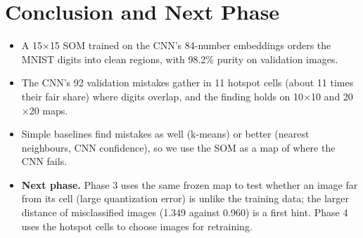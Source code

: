 \documentclass[11pt]{article}
\begin{document}
\section{Conclusion and Next Phase}

\begin{itemize}[leftmargin=1.4em, itemsep=2pt]
\item A 15$\times$15 SOM trained on the CNN's 84-number embeddings orders the MNIST digits into clean regions, with 98.2\% purity on validation images.
\item The CNN's 92 validation mistakes gather in 11 hotspot cells (about 11 times their fair share) where digits overlap, and the finding holds on 10$\times$10 and 20$\times$20 maps.
\item Simple baselines find mistakes as well (k-means) or better (nearest neighbours, CNN confidence), so we use the SOM as a map of where the CNN fails.
\item \textbf{Next phase.} Phase 3 uses the same frozen map to test whether an image far from its cell (large quantization error) is unlike the training data; the larger distance of misclassified images (1.349 against 0.960) is a first hint. Phase 4 uses the hotspot cells to choose images for retraining.
\end{itemize}

\printbibliography[title={References}]
\end{document}
